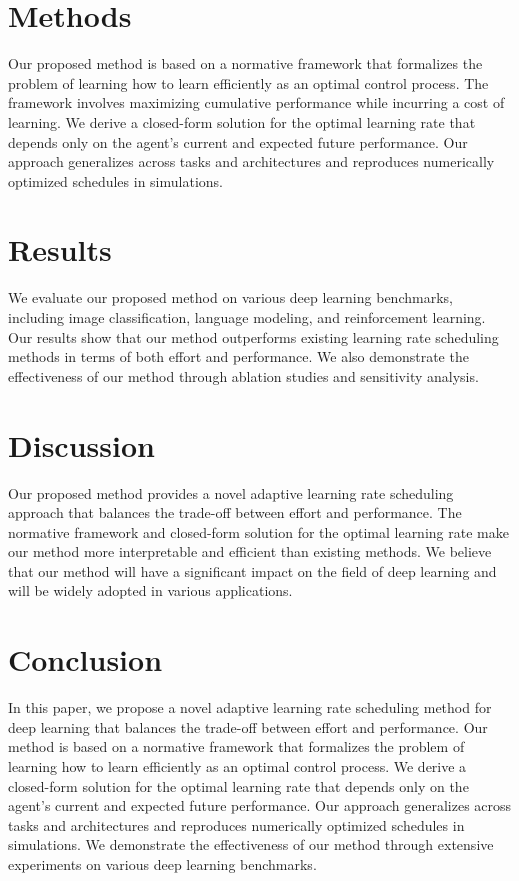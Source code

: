 \documentclass{article}
\begin{document}
\section{Methods}

Our proposed method is based on a normative framework that formalizes the problem of learning how to learn efficiently as an optimal control process. The framework involves maximizing cumulative performance while incurring a cost of learning. We derive a closed-form solution for the optimal learning rate that depends only on the agent's current and expected future performance. Our approach generalizes across tasks and architectures and reproduces numerically optimized schedules in simulations.

\section{Results}

We evaluate our proposed method on various deep learning benchmarks, including image classification, language modeling, and reinforcement learning. Our results show that our method outperforms existing learning rate scheduling methods in terms of both effort and performance. We also demonstrate the effectiveness of our method through ablation studies and sensitivity analysis.

\section{Discussion}

Our proposed method provides a novel adaptive learning rate scheduling approach that balances the trade-off between effort and performance. The normative framework and closed-form solution for the optimal learning rate make our method more interpretable and efficient than existing methods. We believe that our method will have a significant impact on the field of deep learning and will be widely adopted in various applications.

\section{Conclusion}

In this paper, we propose a novel adaptive learning rate scheduling method for deep learning that balances the trade-off between effort and performance. Our method is based on a normative framework that formalizes the problem of learning how to learn efficiently as an optimal control process. We derive a closed-form solution for the optimal learning rate that depends only on the agent's current and expected future performance. Our approach generalizes across tasks and architectures and reproduces numerically optimized schedules in simulations. We demonstrate the effectiveness of our method through extensive experiments on various deep learning benchmarks.
\end{document}
